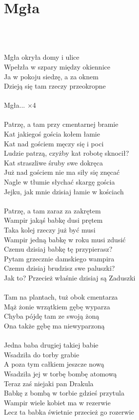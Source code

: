 \documentclass[a5paper, 10pt]{book}
\begin{document}
\section{Mgła}\textcolor{lightgray}{\textit{}}\\~\\
\begin{minipage}[t]{0.8\textwidth}
  Mgła okryła domy i ulice\\
  Wpełzła w szpary między okiennice\\
  Ja w pokoju siedzę, a za oknem\\
  Dzieją się tam rzeczy przeokropne\\
  \\
  Mgła... $\times$4\\
  \\
  Patrzę, a tam przy cmentarnej bramie\\
  Kat jakiegoś gościa kołem łamie\\
  Kat nad gościem męczy się i poci\\
  Ludzie patrzą, czyżby kat robotę sknocił?\\
  Kat straszliwe śruby swe dokręca\\
  Już nad gościem nie ma siły się znęcać\\
  Nagle w tłumie słychać skargę gościa\\
  Jejku, jak mnie dzisiaj łamie w kościach\\
  \\
  Patrzę, a tam zaraz za zakrętem\\
  Wampir jakąś babkę dusi prętem\\
  Taka kolej rzeczy już być musi\\
  Wampir jedną babkę w roku musi zdusić\\
  Czemu dzisiaj babkę tę przypierasz?\\
  Pytam grzecznie damskiego wampira\\
  Czemu dzisiaj brudzisz swe paluszki?\\
  Jak to? Przecież właśnie dzisiaj są Zaduszki\\
  \\
  Tam na plantach, tuż obok cmentarza\\
  Mąż żonie wrzątkiem gębę wyparza\\
  Chyba pójdę tam ze swoją żoną\\
  Ona także gębę ma niewyparzoną\\
  \\
  Jedna baba drugiej takiej babie\\
  Wsadziła do torby grabie\\
  A poza tym całkiem jeszcze nową\\
  Wsadziła jej w torbę bombę atomową\\
  Teraz zaś niejaki pan Drakula\\
  Babkę z bombą w torbie gdzieś przytula\\
  Wampir wiele kobiet ma w rezerwie\\
  Lecz ta babka świetnie przecież go rozerwie\\
\end{minipage}
\end{document}
